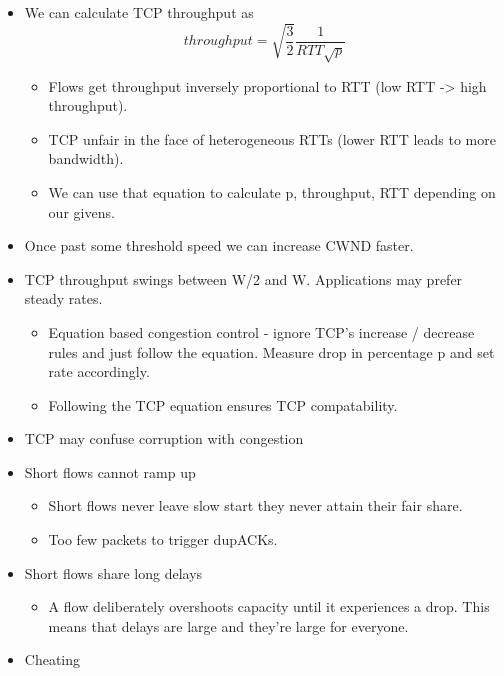 \begin{itemize}
  \begin{itemize}
  \tightlist
  \item
    We can calculate TCP throughput as
    \[throughput = \sqrt{\frac{3}{2}}\frac{1}{RTT \sqrt{p}}\]

    \begin{itemize}
    \tightlist
    \item
      Flows get throughput inversely proportional to RTT (low RTT
      -\textgreater{} high throughput).
    \item
      TCP unfair in the face of heterogeneous RTTs (lower RTT leads to
      more bandwidth).
    \item
      We can use that equation to calculate p, throughput, RTT depending
      on our givens.
    \end{itemize}
  \item
    Once past some threshold speed we can increase CWND faster.
  \item
    TCP throughput swings between W/2 and W. Applications may prefer
    steady rates.

    \begin{itemize}
    \tightlist
    \item
      Equation based congestion control - ignore TCP's increase /
      decrease rules and just follow the equation. Measure drop in
      percentage p and set rate accordingly.
    \item
      Following the TCP equation ensures TCP compatability.
    \end{itemize}
  \item
    TCP may confuse corruption with congestion
  \item
    Short flows cannot ramp up

    \begin{itemize}
    \tightlist
    \item
      Short flows never leave slow start they never attain their fair
      share.
    \item
      Too few packets to trigger dupACKs.
    \end{itemize}
  \item
    Short flows share long delays

    \begin{itemize}
    \tightlist
    \item
      A flow deliberately overshoots capacity until it experiences a
      drop. This means that delays are large and they're large for
      everyone.
    \end{itemize}
  \item
    Cheating


\end{itemize}
\end{itemize}
